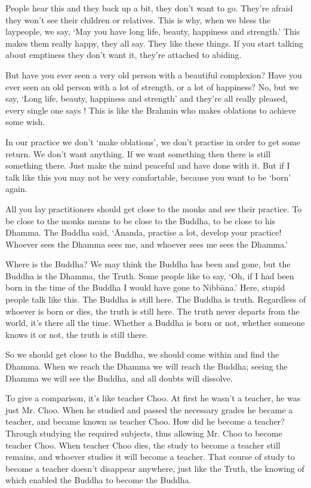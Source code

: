 People hear this and they back up a bit, they don't want to go. They're afraid they won't see their children or relatives. This is why, when we bless the laypeople, we say, `May you have long life, beauty, happiness and strength.' This makes them really happy,  they all say. They like these things. If you start talking about emptiness they don't want it, they're attached to abiding. 

But have you ever seen a very old person with a beautiful complexion? Have you ever seen an old person with a lot of strength, or a lot of happiness? No, but we say, `Long life, beauty, happiness and strength' and they're all really pleased, every single one says ! This is like the Brahmin who makes oblations to achieve some wish. 

In our practice we don't `make oblations', we don't practise in order to get some return. We don't want anything. If we want something then there is still something there. Just make the mind peaceful and have done with it. But if I talk like this you may not be very comfortable, because you want to be `born' again. 

All you lay practitioners should get close to the monks and see their practice. To be close to the monks means to be close to the Buddha, to be close to his Dhamma. The Buddha said, `\=Ananda, practise a lot, develop your practice! Whoever sees the Dhamma sees me, and whoever sees me sees the Dhamma.' 

Where is the Buddha? We may think the Buddha has been and gone, but the Buddha is the Dhamma, the Truth. Some people like to say, `Oh, if I had been born in the time of the Buddha I would have gone to Nibb\=ana.' Here, stupid people talk like this. The Buddha is still here. The Buddha is truth. Regardless of whoever is born or dies, the truth is still here. The truth never departs from the world, it's there all the time. Whether a Buddha is born or not, whether someone knows it or not, the truth is still there. 

So we should get close to the Buddha, we should come within and find the Dhamma. When we reach the Dhamma we will reach the Buddha; seeing the Dhamma we will see the Buddha, and all doubts will dissolve. 

To give a comparison, it's like teacher Choo. At first he wasn't a teacher, he was just Mr. Choo. When he studied and passed the necessary grades he became a teacher, and became known as teacher Choo. How did he become a teacher? Through studying the required subjects, thus allowing Mr. Choo to become teacher Choo. When teacher Choo dies, the study to become a teacher still remains, and whoever studies it will become a teacher. That course of study to become a teacher doesn't disappear anywhere, just like the Truth, the knowing of which enabled the Buddha to become the Buddha. 

